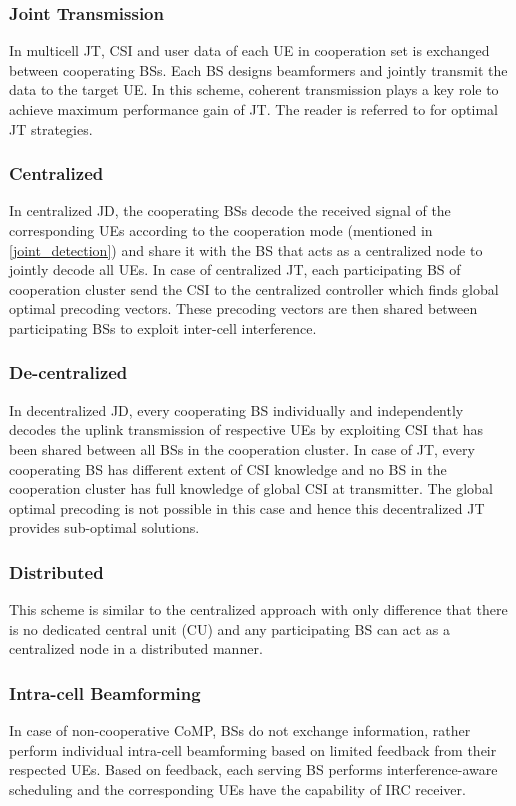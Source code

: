 \documentclass[article,10pt,twocolumn]{IEEEtran}
\begin{document}
\subsubsection{Joint Transmission}
In multicell JT, CSI and user data of each UE in cooperation set is exchanged between cooperating BSs. Each BS designs beamformers and jointly transmit the data to the target UE. In this scheme, coherent transmission plays a key role to achieve maximum performance gain of JT. The reader is referred to \citep{1207369, 1291726, 4203115} for optimal JT strategies.
\subsubsection{Centralized}
In centralized JD, the cooperating BSs decode the received signal of the corresponding UEs according to the cooperation mode (mentioned in \ref{joint_detection}) and share it with the BS that acts as a centralized node to jointly decode all UEs. In case of centralized JT, each participating BS of cooperation cluster send the CSI to the centralized controller which finds global optimal precoding vectors. These precoding vectors are then shared between participating BSs to exploit inter-cell interference.
\subsubsection{De-centralized}
In decentralized JD, every cooperating BS individually and independently decodes the uplink transmission of respective UEs by exploiting CSI that has been shared between all BSs in the cooperation cluster. In case of JT, every cooperating BS has different extent of CSI knowledge and no BS in the cooperation cluster has full knowledge of global CSI at transmitter. The global optimal precoding is not possible in this case and hence this decentralized JT provides sub-optimal solutions.
\subsubsection{Distributed}
This scheme is similar to the centralized approach with only difference that there is no dedicated central unit (CU) and any participating BS can act as a centralized node in a distributed manner.
\subsubsection{Intra-cell Beamforming}
In case of non-cooperative CoMP, BSs do not exchange information, rather perform individual intra-cell beamforming based on limited feedback from their respected UEs. Based on feedback, each serving BS performs interference-aware scheduling and the corresponding UEs have the capability of IRC receiver. 
\end{document}
